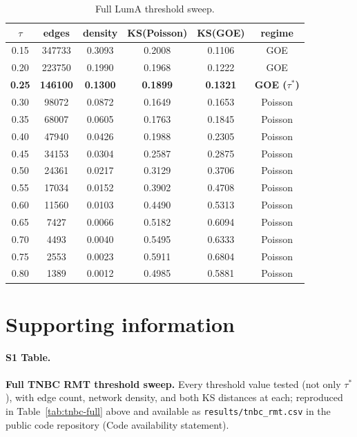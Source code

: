 \documentclass[11pt]{article}
\begin{document}
\begin{table}[h]
\centering
\caption{Full LumA threshold sweep.}
\label{tab:luma-full}
\begin{tabular}{cccccc}
\toprule
$\tau$ & edges & density & KS(Poisson) & KS(GOE) & regime \\
\midrule
0.15 & 347733 & 0.3093 & 0.2008 & 0.1106 & GOE \\
0.20 & 223750 & 0.1990 & 0.1968 & 0.1222 & GOE \\
\textbf{0.25} & \textbf{146100} & \textbf{0.1300} & \textbf{0.1899} & \textbf{0.1321} & \textbf{GOE ($\tau^*$)} \\
0.30 & 98072  & 0.0872 & 0.1649 & 0.1653 & Poisson \\
0.35 & 68007  & 0.0605 & 0.1763 & 0.1845 & Poisson \\
0.40 & 47940  & 0.0426 & 0.1988 & 0.2305 & Poisson \\
0.45 & 34153  & 0.0304 & 0.2587 & 0.2875 & Poisson \\
0.50 & 24361  & 0.0217 & 0.3129 & 0.3706 & Poisson \\
0.55 & 17034  & 0.0152 & 0.3902 & 0.4708 & Poisson \\
0.60 & 11560  & 0.0103 & 0.4490 & 0.5313 & Poisson \\
0.65 & 7427   & 0.0066 & 0.5182 & 0.6094 & Poisson \\
0.70 & 4493   & 0.0040 & 0.5495 & 0.6333 & Poisson \\
0.75 & 2553   & 0.0023 & 0.5911 & 0.6804 & Poisson \\
0.80 & 1389   & 0.0012 & 0.4985 & 0.5881 & Poisson \\
\bottomrule
\end{tabular}
\end{table}

\section*{Supporting information}

\paragraph{S1 Table.}
\textbf{Full TNBC RMT threshold sweep.} Every threshold value tested
(not only $\tau^*$), with edge count, network density, and both KS
distances at each; reproduced in Table~\ref{tab:tnbc-full} above and
available as \texttt{results/tnbc\_rmt.csv} in the public code
repository (Code availability statement).
\end{document}
